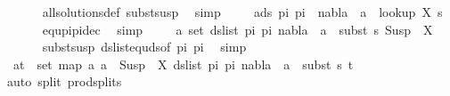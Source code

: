 \begin{isabellebody}
\ \ \ \ \ \isamarkupfalse%
\ all{\isacharunderscore}{\kern0pt}solutions{\isacharunderscore}{\kern0pt}def\ subst{\isacharunderscore}{\kern0pt}susp\ \isamarkupfalse%
\ simp\isanewline
\ \ \ \isamarkupfalse%
\ {\isachardoublequoteopen}{\isasymforall}a{\isasymin}ds\ pi{}\ pi{}{\isachardot}{\kern0pt}\ \ nabla{}\ {\isasymturnstile}\ a\ {\isasymsharp}\ {\isacharparenleft}{\kern0pt}look{\isacharunderscore}{\kern0pt}up\ X\ s{}{\isacharparenright}{\kern0pt}{\isachardoublequoteclose}\isanewline
\ \ \ \ \ \isamarkupfalse%
\ equ{\isacharunderscore}{\kern0pt}pi{}{\isacharunderscore}{\kern0pt}pi{}{\isacharunderscore}{\kern0pt}dec\ \isamarkupfalse%
\ simp\isanewline
\ \ \ \isamarkupfalse%
\ {\isachardoublequoteopen}{\isasymforall}a{\isasymin}\ set\ {\isacharparenleft}{\kern0pt}ds{\isacharunderscore}{\kern0pt}list\ pi{}\ pi{}{\isacharparenright}{\kern0pt}{\isachardot}{\kern0pt}\ nabla{}\ {\isasymturnstile}\ a\ {\isasymsharp}\ subst\ s{}\ {\isacharparenleft}{\kern0pt}Susp\ {\isacharbrackleft}{\kern0pt}{\isacharbrackright}{\kern0pt}\ X{\isacharparenright}{\kern0pt}{\isachardoublequoteclose}\isanewline
\ \ \ \ \ \isamarkupfalse%
\ subst{\isacharunderscore}{\kern0pt}susp\ ds{\isacharunderscore}{\kern0pt}list{\isacharunderscore}{\kern0pt}equ{\isacharunderscore}{\kern0pt}ds{\isacharbrackleft}{\kern0pt}of\ pi{}\ pi{}{\isacharbrackright}{\kern0pt}\ \isamarkupfalse%
\ simp\isanewline
\ \ \ \isamarkupfalse%
\ {\isachardoublequoteopen}{\isasymforall}\ {\isacharparenleft}{\kern0pt}a{\isacharcomma}{\kern0pt}t{\isacharparenright}{\kern0pt}\ {\isasymin}\ set\ {\isacharparenleft}{\kern0pt}map\ {\isacharparenleft}{\kern0pt}{\isasymlambda}a{\isachardot}{\kern0pt}\ a\ {\isasymsharp}{\isacharquery}{\kern0pt}\ Susp\ {\isacharbrackleft}{\kern0pt}{\isacharbrackright}{\kern0pt}\ X{\isacharparenright}{\kern0pt}\ {\isacharparenleft}{\kern0pt}ds{\isacharunderscore}{\kern0pt}list\ pi{}\ pi{}{\isacharparenright}{\kern0pt}{\isacharparenright}{\kern0pt}{\isachardot}{\kern0pt}\ nabla{}\ {\isasymturnstile}\ a\ {\isasymsharp}\ subst\ s{}\ t{\isachardoublequoteclose}\isanewline
\ \ \ \ \isamarkupfalse%
\ {\isacharparenleft}{\kern0pt}auto\ split{\isacharcolon}{\kern0pt}\ prod{\isachardot}{\kern0pt}splits{\isacharparenright}{\kern0pt}\isanewline
\ \ \ \isamarkupfalse%

\end{isabellebody}
